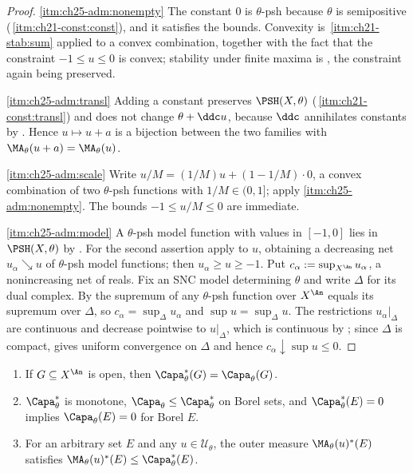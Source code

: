 \begin{proof}
\cref{itm:ch25-adm:nonempty}  The constant $0$ is $\theta$-psh because
$\theta$ is semipositive
(\,\cref{itm:ch21-const:const}), and it satisfies
the bounds.  Convexity is
\,\cref{itm:ch21-stab:sum} applied to a convex
combination, together with the fact that the constraint $-1\leq u\leq0$ is
convex; stability under finite maxima is
, the constraint again being preserved.

\cref{itm:ch25-adm:transl}  Adding a constant preserves $\PSH(X,\theta)$
(\,\cref{itm:ch21-const:transl}) and does not change
$\theta+\ddc u$, because $\ddc$ annihilates constants by
.  Hence $u\mapsto u+a$ is a bijection between the two
families with $\MA_\theta(u+a)=\MA_\theta(u)$.

\cref{itm:ch25-adm:scale}  Write $u/M=(1/M)u+(1-1/M)\cdot0$, a convex
combination of two $\theta$-psh functions with $1/M\in(0,1]$; apply
\cref{itm:ch25-adm:nonempty}.  The bounds $-1\leq u/M\leq0$ are immediate.

\cref{itm:ch25-adm:model}  A $\theta$-psh model function with values in
$[-1,0]$ lies in $\PSH(X,\theta)$ by
.  For the second assertion apply
 to $u$, obtaining a decreasing net
$u_\alpha\searrow u$ of $\theta$-psh model functions; then
$u_\alpha\geq u\geq-1$.  Put $c_\alpha:=\sup_{X^{\An}}u_\alpha$, a
nonincreasing net of reals.  Fix an SNC model determining $\theta$ and
write $\Delta$ for its dual complex.  By
 the supremum of any $\theta$-psh function
over $X^{\An}$ equals its supremum over $\Delta$, so
$c_\alpha=\sup_\Delta u_\alpha$ and $\sup u=\sup_\Delta u$.  The
restrictions $u_\alpha|_\Delta$ are continuous and decrease pointwise to
$u|_\Delta$, which is continuous by
; since $\Delta$ is compact,
 gives uniform convergence on $\Delta$ and hence
$c_\alpha\downarrow\sup u\leq0$.
\end{proof}

\begin{lemma}
\label{lem:ch25-inner-outer}
\begin{enumerate}
\item\label{itm:ch25-io:open}
 If $G\subseteq X^{\An}$ is open, then
 $\Capa_\theta^*(G)=\Capa_\theta(G)$.
\item\label{itm:ch25-io:mono}
 $\Capa_\theta^*$ is monotone, $\Capa_\theta\leq\Capa_\theta^*$ on Borel
 sets, and $\Capa^*_\theta(E)=0$ implies $\Capa_\theta(E)=0$ for Borel
 $E$.
\item\label{itm:ch25-io:radon}
 For an arbitrary set $E$ and any $u\in\mathcal U_\theta$, the outer
 measure $\MA_\theta(u)^*(E)$ satisfies
 $\MA_\theta(u)^*(E)\leq\Capa^*_\theta(E)$.
\end{enumerate}
\end{lemma}


